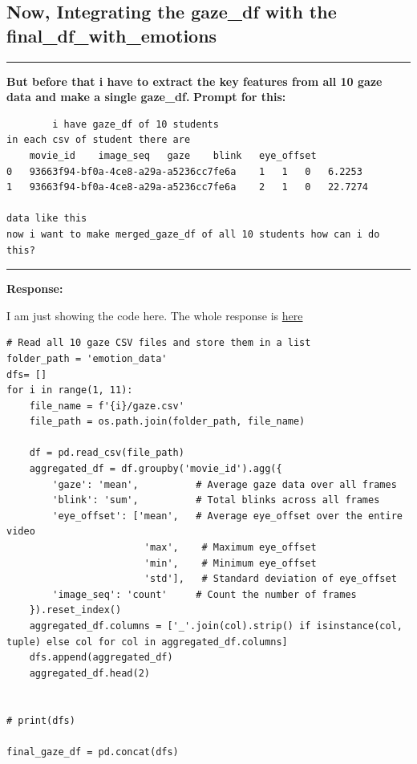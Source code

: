 \documentclass[11pt,a4paper]{article}
\begin{document}
\subsection{Now, Integrating the gaze\_df with the final\_df\_with\_emotions}
\begin{center}
    \color{red}\rule{1\linewidth}{1mm}
\end{center}
\textbf{But before that i have to extract the key features from all 10 gaze data and make a single gaze\_df.}
\textbf{Prompt for this:}
\begin{tcolorbox}
    \begin{lstlisting}
        i have gaze_df of 10 students 
in each csv of student there are 
	movie_id	image_seq	gaze	blink	eye_offset
0	93663f94-bf0a-4ce8-a29a-a5236cc7fe6a	1	1	0	6.2253
1	93663f94-bf0a-4ce8-a29a-a5236cc7fe6a	2	1	0	22.7274

data like this
now i want to make merged_gaze_df of all 10 students how can i do this?

    \end{lstlisting}
\end{tcolorbox}

\begin{center}
    \color{red}\rule{1\linewidth}{0.5mm}
\end{center}

\textbf{Response:}
\begin{tcolorbox}
I am just showing the code here. The whole response is \href{https://chatgpt.com/share/66eacd2e-b8f8-8009-8507-b3895c422e0b}{here}
    \begin{lstlisting}
# Read all 10 gaze CSV files and store them in a list
folder_path = 'emotion_data'
dfs= []
for i in range(1, 11):
    file_name = f'{i}/gaze.csv'
    file_path = os.path.join(folder_path, file_name)
    
    df = pd.read_csv(file_path)
    aggregated_df = df.groupby('movie_id').agg({
        'gaze': 'mean',          # Average gaze data over all frames
        'blink': 'sum',          # Total blinks across all frames
        'eye_offset': ['mean',   # Average eye_offset over the entire video
                        'max',    # Maximum eye_offset
                        'min',    # Minimum eye_offset
                        'std'],   # Standard deviation of eye_offset
        'image_seq': 'count'     # Count the number of frames
    }).reset_index()
    aggregated_df.columns = ['_'.join(col).strip() if isinstance(col, tuple) else col for col in aggregated_df.columns]
    dfs.append(aggregated_df)
    aggregated_df.head(2)

    
# print(dfs)

final_gaze_df = pd.concat(dfs)
\end{lstlisting}
\end{tcolorbox}
        
\end{document}
